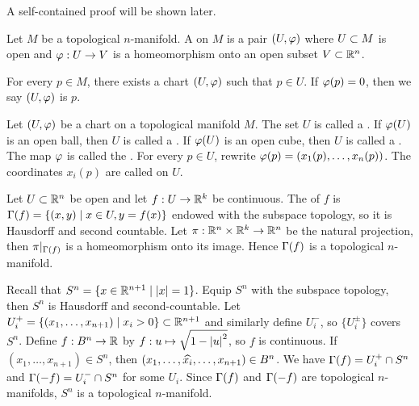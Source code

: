 \documentclass[10pt]{article}
\begin{document}
\par
A self-contained proof will be shown later.
\begin{definition}
    Let $M$ be a topological $n$-manifold. A  on $M$ is a pair $(U,\varphi)$ where $U\subset M$ is open and $\varphi:U\to V$ is a homeomorphism onto an open subset $V\subset{\mathbb{R}}^{n}$.
\end{definition}
\par
For every $p\in M$, there exists a chart $(U,\varphi)$ such that $p\in U$. If $\varphi(p)=0$, then we say $(U,\varphi)$ is  $p$.
\begin{definition}
    Let $(U,\varphi)$ be a chart on a topological manifold $M$. The set $U$ is called a . If $\varphi(U)$ is an open ball, then $U$ is called a . If $\varphi(U)$ is an open cube, then $U$ is called a . The map $\varphi$ is called the . For every $p\in U$, rewrite $\varphi(p)=({x}_{1}(p),\dots,{x}_{n}(p))$. The coordinates ${x}_{i}(p)$ are called  on $U$.
\end{definition}
\begin{example}
    Let $U\subset{\mathbb{R}}^{n}$ be open and let $f:U\to{\mathbb{R}}^{k}$ be continuous. The  of $f$ is $\Gamma(f)=\{(x,y)\mid x\in U,y=f(x)\}$ endowed with the subspace topology, so it is Hausdorff and second countable. Let $\pi:{\mathbb{R}}^{n}\times{\mathbb{R}}^{k}\to{\mathbb{R}}^{n}$ be the natural projection, then $\pi{|}_{\Gamma(f)}$ is a homeomorphism onto its image. Hence $\Gamma(f)$ is a topological $n$-manifold.
\end{example}
\begin{example}
    Recall that ${S}^{n}=\{x\in{\mathbb{R}}^{n+1}\mid|x|=1\}$. Equip ${S}^{n}$ with the subspace topology, then ${S}^{n}$ is Hausdorff and second-countable. Let ${U}_{i}^{+}=\{({x}_{1},\dots,{x}_{n+1})\mid{x}_{i}>0\}\subset{\mathbb{R}}^{n+1}$ and similarly define ${U}_{i}^{-}$, so $\{{U}_{i}^{\pm}\}$ covers ${S}^{n}$. Define $f:{B}^{n}\to\mathbb{R}$ by $f:u\mapsto\sqrt{1-{|u|}^{2}}$, so $f$ is continuous. If $({x}_{1},\dots,{x}_{n+1})\in{S}^{n}$, then $({x}_{1},\dots,\widehat{{x}_{i}},\dots,{x}_{n+1})\in{B}^{n}$. We have $\Gamma(f)={U}_{i}^{+}\cap{S}^{n}$ and $\Gamma(-f)={U}_{i}^{-}\cap{S}^{n}$ for some ${U}_{i}$. Since $\Gamma(f)$ and $\Gamma(-f)$ are topological $n$-manifolds, ${S}^{n}$ is a topological $n$-manifold.
\end{example}
\end{document}
